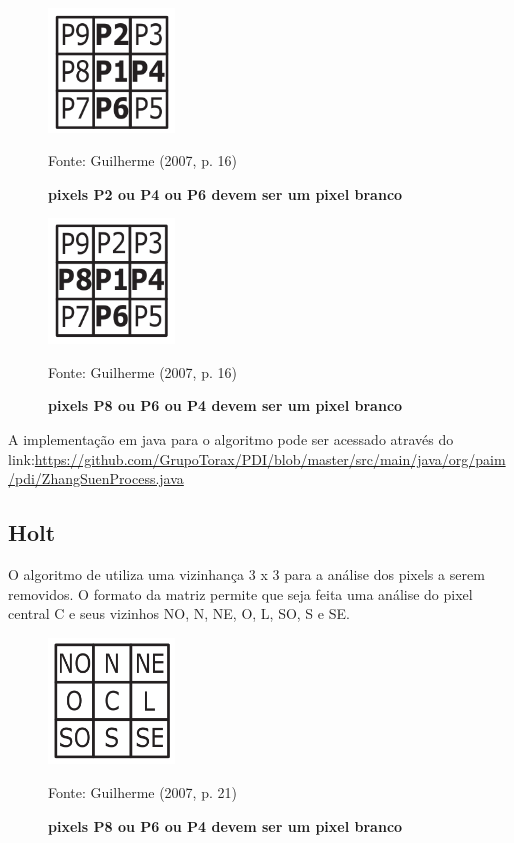 \documentclass[
	12pt,				%
	oneside,			%
	a4paper,			%
	english,			%
	french,				%
	spanish,			%
	brazil,				%
	]{abntex2}
\begin{document}
\begin{figure}[ht]
\centering
\caption{\textbf{pixels P2 ou P4 ou P6 devem ser um pixel branco}}
\includegraphics[width=0.3\textwidth]{imagens/zhangsuen3.png}

Fonte: Guilherme (2007, p. 16)
\label{fig:zhangsuen3}
\end{figure}

\begin{figure}[ht]
\centering
\caption{\textbf{pixels P8 ou P6 ou P4 devem ser um pixel branco}}
\includegraphics[width=0.3\textwidth]{imagens/zhangsuen4.png}

Fonte: Guilherme (2007, p. 16)
\label{fig:zhangsuen4}
\end{figure}

A implementação em java para o algoritmo pode ser acessado através do link:\url{https://github.com/GrupoTorax/PDI/blob/master/src/main/java/org/paim/pdi/ZhangSuenProcess.java}

\subsection{Holt}    

O algoritmo de \citet{holt1987improved} utiliza uma vizinhança 3 x 3 para a análise dos pixels a serem removidos. O formato da matriz permite que seja feita uma análise do pixel central C e seus vizinhos NO, N, NE, O, L, SO, S e SE.

\begin{figure}[ht]
\centering
\caption{\textbf{pixels P8 ou P6 ou P4 devem ser um pixel branco}}
\includegraphics[width=0.3\textwidth]{imagens/holt.png}

Fonte: Guilherme (2007, p. 21)
\label{fig:holt}
\end{figure}
\end{document}
